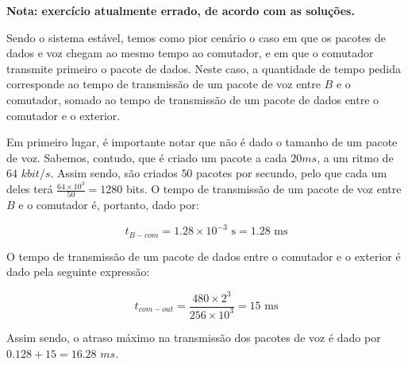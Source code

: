 \begin{enumerate}[leftmargin=\labelsep]
        \textbf{Nota: exercício atualmente errado, de acordo com as soluções.}

        Sendo o sistema estável, temos como pior cenário o caso em que os pacotes de dados
        e voz chegam ao mesmo tempo ao comutador, e em que o comutador transmite primeiro
        o pacote de dados. Neste caso, a quantidade de tempo pedida corresponde ao tempo
        de transmissão de um pacote de voz entre $B$ e o comutador, somado ao tempo de
        transmissão de um pacote de dados entre o comutador e o exterior.

        Em primeiro lugar, é importante notar que não é dado o tamanho de um pacote de voz.
        Sabemos, contudo, que é criado um pacote a cada $20 ms$, a um ritmo de $64$ $kbit/s$.
        Assim sendo, são criados $50$ pacotes por secundo, pelo que cada um deles terá
        $\frac{64 \times 10^3}{50} = 1280$ bits. O tempo de transmissão de um pacote de voz
        entre $B$ e o comutador é, portanto, dado por:

        $$
          t_{B-com} = 1.28 \times 10^{-3} \text{ s} = 1.28 \text{ ms}
        $$

        O tempo de transmissão de um pacote de dados entre o comutador e o exterior é dado
        pela seguinte expressão:

        $$
          t_{com-out} = \frac{480 \times 2^3}{256 \times 10^3} = 15 \text{ ms}
        $$

        Assim sendo, o atraso máximo na transmissão dos pacotes de voz é dado por $0.128 + 15 = 16.28$ $ms$.
\end{enumerate}